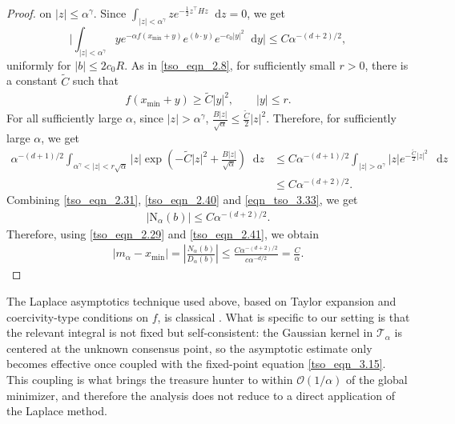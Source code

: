 \documentclass{article}
\newcommand*\der{\mathop{}\!\mathrm{d}}
\numberwithin{equation}{section}
\begin{document}
\begin{proof}
on \(|z|\le \alpha^\gamma\). 
Since  $\int_{|z| < \alpha^\gamma} z e^{-\frac{1}{2}z^{\top}H z} \der z = 0$,  we get
\begin{equation}\label{tso_eqn_2.40}
   \bigg| \int_{|z|<\alpha^\gamma}
    ye^{-\alpha f(x_{\min}+y)}
    e^{(b\cdot y)}
    e^{-c_0|y|^2}
    \der y\bigg| \leq
    C\alpha^{-(d+2)/2},
\end{equation}
uniformly for $|b|\leq 2c_0 R$.  As in \eqref{tso_eqn_2.8}, for sufficiently small $r >0$, there is a constant $\tilde{C}$ such that
\begin{align*}
    f(x_{\min} + y) \geq \tilde{C} |y|^2,\qquad |y|\leq r.
\end{align*}
For all sufficiently large $\alpha$, since $|z|>\alpha^\gamma$, $\frac{B|z|}{\sqrt\alpha}
    \leq \frac{\tilde C}{2}|z|^2$. Therefore, for sufficiently large $\alpha$, we get
\begin{align}\label{eqn_tso_3.33}
        \alpha^{-(d+1)/2}
    \int_{\alpha^\gamma<|z|<r\sqrt\alpha}
    |z|\exp\left(-\tilde{C} |z|^2
        +
        \frac{B|z|}{\sqrt\alpha}
    \right)\der z & \leq  
    C\alpha^{-(d+1)/2}
    \int_{|z|>\alpha^\gamma}
    |z|e^{-\frac{\tilde{C}}{2}|z|^2}\,\der z  \nonumber 
    \\   &  \leq  C\alpha^{-(d+2)/2}.
\end{align}
Combining \eqref{tso_eqn_2.31}, \eqref{tso_eqn_2.40} and \eqref{eqn_tso_3.33}, we get
\begin{align}\label{tso_eqn_2.41}
    |\mathrm{N}_\alpha(b)| \leq
    C\alpha^{-(d+2)/2}.
\end{align}
Therefore, using \eqref{tso_eqn_2.29} and \eqref{tso_eqn_2.41}, we obtain
\begin{align}
 |m_\alpha - x_{\min}| =    \left|\frac{N_\alpha(b)}{D_\alpha(b)}\right|
    \leq
    \frac{
        C\alpha^{-(d+2)/2} }{        c\alpha^{-d/2}} =
    \frac{C}{\alpha}.
\end{align}
\end{proof}
The Laplace asymptotics technique used above, based on Taylor expansion and coercivity-type conditions on $f$, is classical \cite{wong2001asymptotic, tierney1986accurate, ellis1982laplace}. What is specific to our setting is that the relevant integral is not fixed but self-consistent: the Gaussian kernel in $\mathcal{T}_\alpha$ is centered at the unknown consensus point, so the asymptotic estimate only becomes effective once coupled with the fixed-point equation \eqref{tso_eqn_3.15}. This coupling is what brings the treasure hunter to within $\mathcal{O}(1/\alpha)$ of the global minimizer, and therefore the analysis does not reduce to a direct application of the Laplace method.
\end{document}
